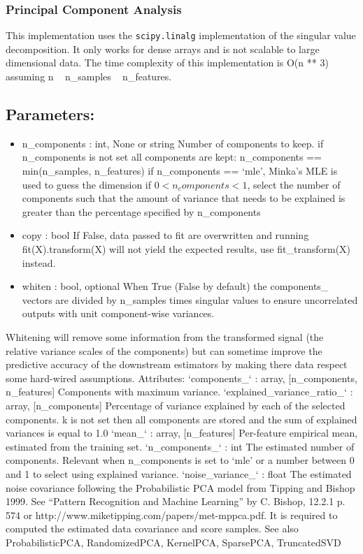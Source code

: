 \begin{frame}[fragile]
	\frametitle{Principal Component Analysis}
	
	
This implementation uses the \texttt{scipy.linalg} implementation of the singular value decomposition. It only works for dense arrays and is not scalable to large dimensional data.
The time complexity of this implementation is O(n ** 3) assuming n ~ n_samples ~ n_features.

\subsection*{Parameters:}	
\begin{itemize}
\item n\_components : int, None or string
Number of components to keep. if n_components is not set all components are kept:
n_components == min(n_samples, n_features)
if n_components == ‘mle’, Minka’s MLE is used to guess the dimension if $0 < n_components < 1$, select the number of components such that the amount of variance that needs to be explained is greater than the percentage specified by n_components
\item copy : bool
If False, data passed to fit are overwritten and running fit(X).transform(X) will not yield the expected results, use fit_transform(X) instead.
\item whiten : bool, optional
When True (False by default) the components_ vectors are divided by n_samples times singular values to ensure uncorrelated outputs with unit component-wise variances.
\end{itemize}

Whitening will remove some information from the transformed signal (the relative variance scales of the components) but can sometime improve the predictive accuracy of the downstream estimators by making there data respect some hard-wired assumptions.
Attributes:	
`components_` : array, [n_components, n_features]
Components with maximum variance.
`explained_variance_ratio_` : array, [n_components]
Percentage of variance explained by each of the selected components. k is not set then all components are stored and the sum of explained variances is equal to 1.0
`mean_` : array, [n_features]
Per-feature empirical mean, estimated from the training set.
`n_components_` : int
The estimated number of components. Relevant when n_components is set to ‘mle’ or a number between 0 and 1 to select using explained variance.
`noise_variance_` : float
The estimated noise covariance following the Probabilistic PCA model from Tipping and Bishop 1999. See “Pattern Recognition and Machine Learning” by C. Bishop, 12.2.1 p. 574 or http://www.miketipping.com/papers/met-mppca.pdf. It is required to computed the estimated data covariance and score samples.
See also ProbabilisticPCA, RandomizedPCA, KernelPCA, SparsePCA, TruncatedSVD

\end{frame}
